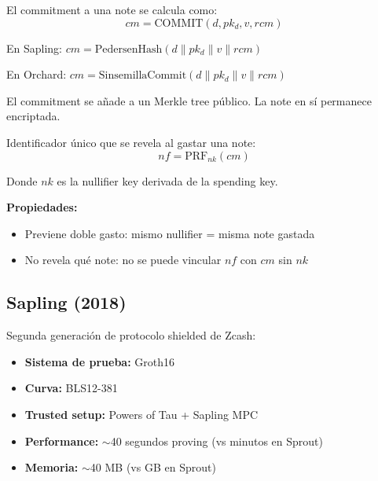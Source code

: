 \documentclass[11pt,a4paper,twoside]{book}
\begin{document}
\begin{definition}
El commitment a una note se calcula como:
\[
cm = \text{COMMIT}(d, pk_d, v, rcm)
\]

En Sapling: $cm = \text{PedersenHash}(d \| pk_d \| v \| rcm)$

En Orchard: $cm = \text{SinsemillaCommit}(d \| pk_d \| v \| rcm)$

El commitment se a\~nade a un Merkle tree p\'ublico. La note en s\'i permanece encriptada.
\end{definition}

\begin{definition}[Nullifier]
Identificador \'unico que se revela al gastar una note:
\[
nf = \text{PRF}_{nk}(cm)
\]

Donde $nk$ es la nullifier key derivada de la spending key.

\textbf{Propiedades:}
\begin{itemize}
    \item Previene doble gasto: mismo nullifier = misma note gastada
    \item No revela qu\'e note: no se puede vincular $nf$ con $cm$ sin $nk$
\end{itemize}
\end{definition}

\subsection{Sapling (2018)}

\begin{definition}[Sapling]
Segunda generaci\'on de protocolo shielded de Zcash:
\begin{itemize}
    \item \textbf{Sistema de prueba:} Groth16
    \item \textbf{Curva:} BLS12-381
    \item \textbf{Trusted setup:} Powers of Tau + Sapling MPC
    \item \textbf{Performance:} $\sim$40 segundos proving (vs minutos en Sprout)
    \item \textbf{Memoria:} $\sim$40 MB (vs GB en Sprout)
\end{itemize}
\end{definition}
\end{document}
